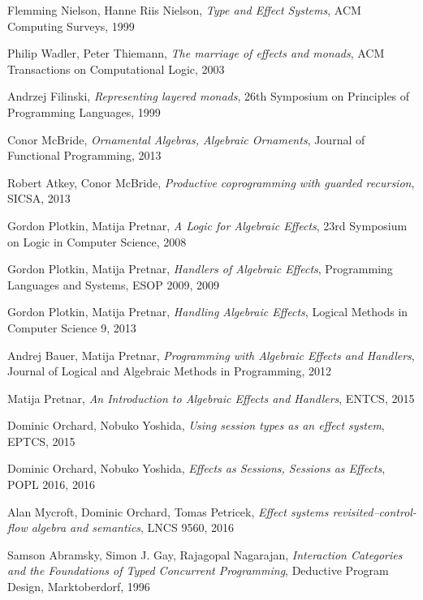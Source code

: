 \documentclass{article}
\begin{document}
\begin{thebibliography}{99}
    Flemming Nielson, Hanne Riis Nielson,
    \emph{Type and Effect Systems},
    ACM Computing Surveys,
    1999

    Philip Wadler, Peter Thiemann,
    \emph{The marriage of effects and monads},
    ACM Transactions on Computational Logic,
    2003

    Andrzej Filinski,
    \emph{Representing layered monads},
    26th Symposium on Principles of Programming Languages,
    1999

    Conor McBride,
    \emph{Ornamental Algebras, Algebraic Ornaments},
    Journal of Functional Programming,
    2013

    Robert Atkey, Conor McBride,
    \emph{Productive coprogramming with guarded recursion},
    SICSA,
    2013

    Gordon Plotkin, Matija Pretnar,
    \emph{A Logic for Algebraic Effects},
    23rd Symposium on Logic in Computer Science,
    2008

    Gordon Plotkin, Matija Pretnar,
    \emph{Handlers of Algebraic Effects},
    Programming Languages and Systems, ESOP 2009,
    2009

    Gordon Plotkin, Matija Pretnar,
    \emph{Handling Algebraic Effects},
    Logical Methods in Computer Science 9,
    2013

    Andrej Bauer, Matija Pretnar,
    \emph{Programming with Algebraic Effects and Handlers},
    Journal of Logical and Algebraic Methods in Programming,
    2012

    Matija Pretnar,
    \emph{An Introduction to Algebraic Effects and Handlers},
    ENTCS,
    2015

    Dominic Orchard, Nobuko Yoshida,
    \emph{Using session types as an effect system},
    EPTCS,
    2015

    Dominic Orchard, Nobuko Yoshida,
    \emph{Effects as Sessions, Sessions as Effects},
    POPL 2016,
    2016

    Alan Mycroft, Dominic Orchard, Tomas Petricek,
    \emph{Effect systems revisited--control-flow algebra and semantics},
    LNCS 9560,
    2016

    Samson Abramsky, Simon J. Gay, Rajagopal Nagarajan,
    \emph{Interaction Categories and the Foundations of Typed
      Concurrent Programming},
    Deductive Program Design, Marktoberdorf,
    1996


\end{thebibliography}
\end{document}

